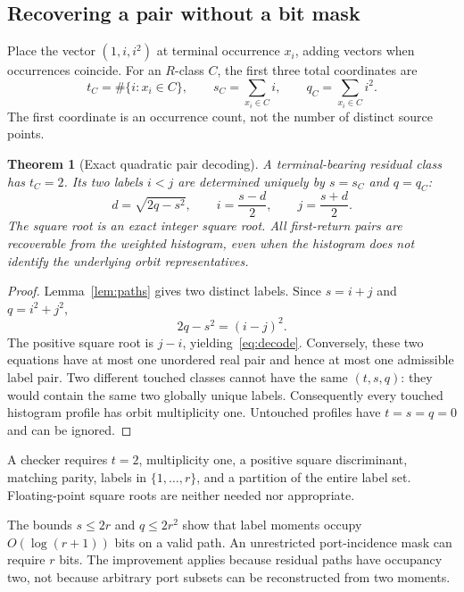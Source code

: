 \documentclass[11pt]{article}
\newtheorem{theorem}{Theorem}[section]
\theoremstyle{definition}\newtheorem{definition}[theorem]{Definition}\newtheorem{example}[theorem]{Example}
\theoremstyle{remark}\newtheorem{remark}[theorem]{Remark}
\begin{document}
\subsection{Recovering a pair without a bit mask}
Place the vector $(1,i,i^2)$ at terminal occurrence $x_i$, adding vectors when occurrences coincide. For an $R$-class $C$, the first three total coordinates are
\[
       t_C=\#\{i:x_i\in C\},\qquad
       s_C=\sum_{x_i\in C}i,\qquad
       q_C=\sum_{x_i\in C}i^2.
\]
The first coordinate is an occurrence count, not the number of distinct source points.

\begin{theorem}[Exact quadratic pair decoding]
\label{thm:pair}
A terminal-bearing residual class has $t_C=2$. Its two labels $i<j$ are determined uniquely by $s=s_C$ and $q=q_C$:
\begin{equation}\label{eq:decode}
 d=\sqrt{2q-s^2},\qquad i=\frac{s-d}{2},\qquad j=\frac{s+d}{2}.
\end{equation}
The square root is an exact integer square root. All first-return pairs are recoverable from the weighted histogram, even when the histogram does not identify the underlying orbit representatives.
\end{theorem}
\begin{proof}
Lemma~\ref{lem:paths} gives two distinct labels. Since $s=i+j$ and $q=i^2+j^2$,
\[
                         2q-s^2=(i-j)^2.
\]
The positive square root is $j-i$, yielding~\eqref{eq:decode}. Conversely, these two equations have at most one unordered real pair and hence at most one admissible label pair. Two different touched classes cannot have the same $(t,s,q)$: they would contain the same two globally unique labels. Consequently every touched histogram profile has orbit multiplicity one. Untouched profiles have $t=s=q=0$ and can be ignored.
\end{proof}

A checker requires $t=2$, multiplicity one, a positive square discriminant, matching parity, labels in $\{1,\ldots,r\}$, and a partition of the entire label set. Floating-point square roots are neither needed nor appropriate.

The bounds $s\le2r$ and $q\le2r^2$ show that label moments occupy $O(\log(r+1))$ bits on a valid path. An unrestricted port-incidence mask can require $r$ bits. The improvement applies because residual paths have occupancy two, not because arbitrary port subsets can be reconstructed from two moments.
\end{document}
